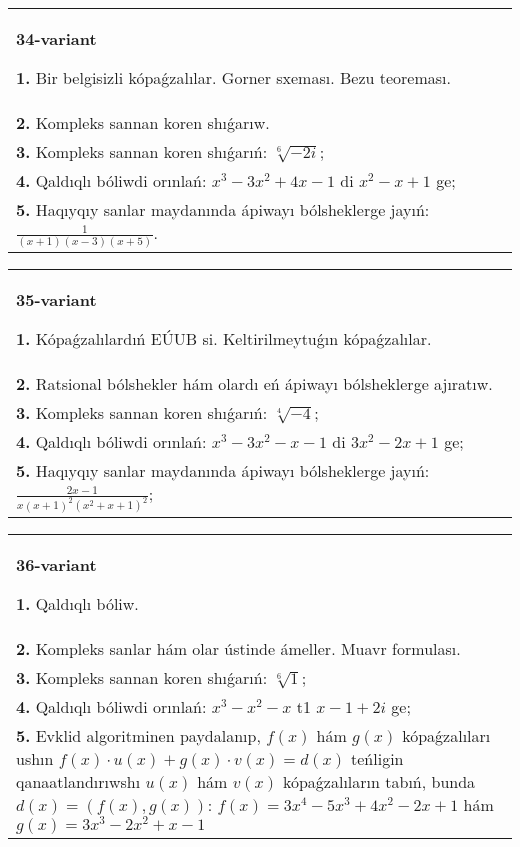 \documentclass{article}
\begin{document}
\begin{tabular}{m{17cm}}
\textbf{34-variant}
\newline

\textbf{1.} Bir belgisizli kópaǵzalılar. Gorner sxeması. Bezu teoreması.  \\
\textbf{2.} Kompleks sannan koren shıǵarıw. \\
\textbf{3.} Kompleks sannan koren shıǵarıń: $\sqrt[6]{-2 i}$; \\
\textbf{4.} Qaldıqlı bóliwdi orınlań:  $x^3-3 x^2+4 x-1$ di $x^2-x+1$ ge; \\
\textbf{5.} Haqıyqıy sanlar maydanında ápiwayı bólsheklerge jayıń:  $\frac{1}{(x+1)(x-3)(x+5)}$. \\

\end{tabular}
\vspace{1cm}


\begin{tabular}{m{17cm}}
\textbf{35-variant}
\newline

\textbf{1.} Kópaǵzalılardıń EÚUB si. Keltirilmeytuǵın   kópaǵzalılar. \\
\textbf{2.} Ratsional bólshekler hám olardı eń ápiwayı bólsheklerge ajıratıw. \\
\textbf{3.} Kompleks sannan koren shıǵarıń: $\sqrt[4]{-4}$; \\
\textbf{4.} Qaldıqlı bóliwdi orınlań: $x^3-3 x^2-x-1$ di $3 x^2-2 x+1$ ge; \\
\textbf{5.} Haqıyqıy sanlar maydanında ápiwayı bólsheklerge jayıń:  $\frac{2 x-1}{x(x+1)^2\left(x^2+x+1\right)^2}$; \\

\end{tabular}
\vspace{1cm}


\begin{tabular}{m{17cm}}
\textbf{36-variant}
\newline

\textbf{1.} Qaldıqlı bóliw.  \\
\textbf{2.} Kompleks sanlar hám olar ústinde ámeller. Muavr formulası.  \\
\textbf{3.} Kompleks sannan koren shıǵarıń: $\sqrt[6]{1}$; \\
\textbf{4.} Qaldıqlı bóliwdi orınlań:  $x^3-x^2-x$ t1 $x-1+2 i$ ge; \\
\textbf{5.} Evklid algoritminen paydalanıp, $f(x)$ hám $g(x)$ kópaǵzalıları ushın $f(x) \cdot u(x)+g(x) \cdot v(x)=d(x)$ teńligin qanaatlandırıwshı $u(x)$ hám $v(x)$ kópaǵzalıların tabıń, bunda $d(x)=(f(x), g(x))$:  $f(x)=3 x^4-5 x^3+4 x^2-2 x+1$ hám $g(x)=3 x^3-2 x^2+x-1$ \\

\end{tabular}
\vspace{1cm}
\end{document}

